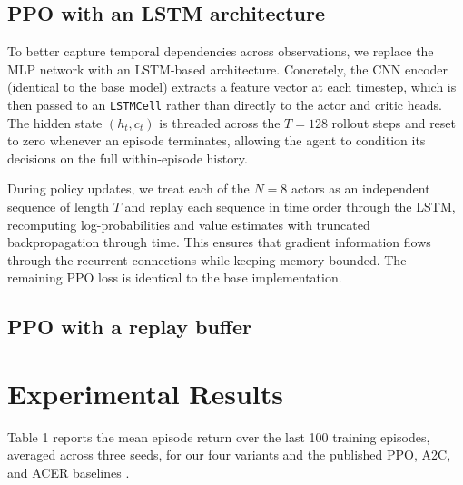 \documentclass{article}
\begin{document}
\subsection{PPO with an LSTM architecture}

To better capture temporal dependencies across observations, we replace the MLP network with an LSTM-based architecture. Concretely, the CNN encoder (identical to the base model) extracts a feature vector at each timestep, which is then passed to an \texttt{LSTMCell} rather than directly to the actor and critic heads. The hidden state $(h_t, c_t)$ is threaded across the $T = 128$ rollout steps and reset to zero whenever an episode terminates, allowing the agent to condition its decisions on the full within-episode history.
 
During policy updates, we treat each of the $N = 8$ actors as an independent sequence of length $T$ and replay each sequence in time order through the LSTM, recomputing log-probabilities and value estimates with truncated backpropagation through time. This ensures that gradient information flows through the recurrent connections while keeping memory bounded. The remaining PPO loss is identical to the base implementation.

\subsection{PPO with a replay buffer}



\section{Experimental Results}
Table 1 reports the mean episode return over the last 100 training episodes, averaged across three seeds, for our four variants and the published PPO, A2C, and ACER baselines \cite{PPOPaper,ACERPaper}.
\end{document}
